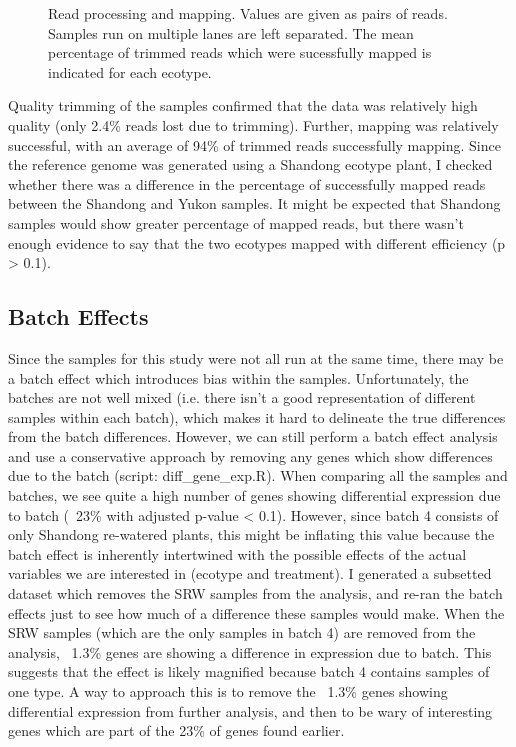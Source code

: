 \documentclass[12pt]{article}
\begin{document}
		\begin{figure}[H]
			\centering
			\scalebox{0.7}{}
			\caption[Read Processing Statistics]{Read processing and mapping. Values are given as pairs of reads. Samples run on multiple lanes are left separated. The mean percentage of trimmed reads which were sucessfully mapped is indicated for each ecotype.}
			\label{read_stats}
		\end{figure}
	
	Quality trimming of the samples confirmed that the data was relatively high quality (only 2.4\% reads lost due to trimming). Further, mapping was relatively successful, with an average of 94\% of trimmed reads successfully mapping. Since the reference genome was generated using a Shandong ecotype plant, I checked whether there was a difference in the percentage of successfully mapped reads between the Shandong and Yukon samples. It might be expected that Shandong samples would show greater percentage of mapped reads, but there wasn't enough evidence to say that the two ecotypes mapped with different efficiency (p > 0.1). 
	
	
	\subsection{Batch Effects}
	Since the samples for this study were not all run at the same time, there may be a batch effect which introduces bias within the samples. Unfortunately, the batches are not well mixed (i.e. there isn't a good representation of different samples within each batch), which makes it hard to delineate the true differences from the batch differences. However, we can still perform a batch effect analysis and use a conservative approach by removing any genes which show differences due to the batch (script: diff\_gene\_exp.R). When comparing all the samples and batches, we see quite a high number of genes showing differential expression due to batch (~23\% with adjusted p-value < 0.1). However, since batch 4 consists of only Shandong re-watered plants, this might be inflating this value because the batch effect is inherently intertwined with the possible effects of the actual variables we are interested in (ecotype and treatment). I generated a subsetted dataset which removes the SRW samples from the analysis, and re-ran the batch effects just to see how much of a difference these samples would make. When the SRW samples (which are the only samples in batch 4) are removed from the analysis, ~1.3\% genes are showing a difference in expression due to batch. This suggests that the effect is likely magnified because batch 4 contains samples of one type. A way to approach this is to remove the ~1.3\% genes showing differential expression from further analysis, and then to be wary of interesting genes which are part of the 23\% of genes found earlier.
	
\end{document}
